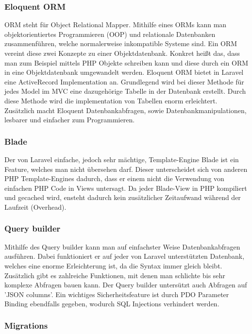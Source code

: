 \subsubsection{Eloquent ORM}

ORM\cite{ORM} steht für Object Relational Mapper. Mithilfe eines ORMs\cite{WasistORM} kann man objektorientiertes Programmieren (OOP) und relationale Datenbanken zusammenführen, welche normalerweise inkompatible Systeme sind. Ein ORM vereint diese zwei Konzepte zu einer Objektdatenbank. Konkret heißt das, dass man zum Beispiel mittels PHP Objekte schreiben kann und diese durch ein ORM in eine Objektdatenbank umgewandelt werden.
Eloquent ORM bietet in Laravel\cite{ORMinLaravel} eine ActiveRecord Implementation an. Grundlegend wird bei dieser Methode für jedes Model im MVC eine dazugehörige Tabelle in der Datenbank erstellt. Durch diese Methode wird die implementation von Tabellen enorm erleichtert. Zusätzlich macht Eloquent Datenbankabfragen, sowie Datenbankmanipulationen, lesbarer und einfacher zum Programmieren.

\subsubsection{Blade}

Der von Laravel einfache, jedoch sehr mächtige, Template-Engine Blade\cite{Blade} ist ein Feature, welches man nicht übersehen darf. Dieser unterscheidet sich von anderen PHP Template-Engines dadurch, dass er einem nicht die Verwendung von einfachen PHP Code in Views untersagt. Da jeder Blade-View in PHP kompiliert und gecached wird, ensteht dadurch kein zusätzlicher Zeitaufwand während der Laufzeit (Overhead).

\subsubsection{Query builder}

Mithilfe des Query builder\cite{QueryBuilder} kann man auf einfachster Weise Datenbankabfragen ausführen. Dabei funktioniert er auf jeder von Laravel unterstützten Datenbank, welches eine enorme Erleichterung ist, da die Syntax immer gleich bleibt. Zusätzlich gibt es zahlreiche Funktionen, mit denen man schlichte bis sehr komplexe Abfragen bauen kann. Der Query builder untersützt auch Abfragen auf 'JSON columns'. Ein wichtiges Sicherheitsfeature ist durch PDO Parameter Binding ebendfalls gegeben, wodurch SQL Injections verhindert werden.

\subsubsection{Migrations}

